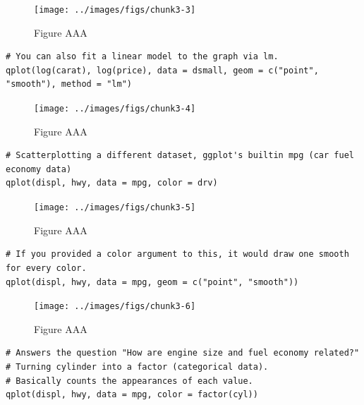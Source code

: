 \begin{figure}[H]

{\centering \texttt{[image: ../images/figs/chunk3-3]} 

}

\caption{Figure AAA}\label{fig:chunk3-3}
\end{figure}

\begin{verbatim}
# You can also fit a linear model to the graph via lm.
qplot(log(carat), log(price), data = dsmall, geom = c("point", "smooth"), method = "lm")
\end{verbatim}

\begin{figure}[H]

{\centering \texttt{[image: ../images/figs/chunk3-4]} 

}

\caption{Figure AAA}\label{fig:chunk3-4}
\end{figure}

\begin{verbatim}
# Scatterplotting a different dataset, ggplot's builtin mpg (car fuel economy data)
qplot(displ, hwy, data = mpg, color = drv)
\end{verbatim}

\begin{figure}[H]

{\centering \texttt{[image: ../images/figs/chunk3-5]} 

}

\caption{Figure AAA}\label{fig:chunk3-5}
\end{figure}

\begin{verbatim}
# If you provided a color argument to this, it would draw one smooth for every color.
qplot(displ, hwy, data = mpg, geom = c("point", "smooth"))
\end{verbatim}

\begin{figure}[H]

{\centering \texttt{[image: ../images/figs/chunk3-6]} 

}

\caption{Figure AAA}\label{fig:chunk3-6}
\end{figure}

\begin{verbatim}
# Answers the question "How are engine size and fuel economy related?"
# Turning cylinder into a factor (categorical data).
# Basically counts the appearances of each value.
qplot(displ, hwy, data = mpg, color = factor(cyl))
\end{verbatim}

